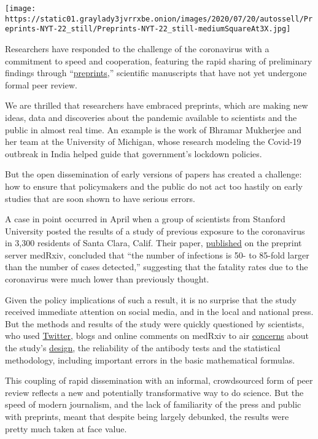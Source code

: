 \texttt{[image: https://static01.graylady3jvrrxbe.onion/images/2020/07/20/autossell/Preprints-NYT-22\_still/Preprints-NYT-22\_still-mediumSquareAt3X.jpg]}

Researchers have responded to the challenge of the coronavirus with a
commitment to speed and cooperation, featuring the rapid sharing of
preliminary findings through
``\href{https://connect.medrxiv.org/relate/content/181}{preprints},''
scientific manuscripts that have not yet undergone formal peer review.

We are thrilled that researchers have embraced preprints, which are
making new ideas, data and discoveries about the pandemic available to
scientists and the public in almost real time. An example is the work of
Bhramar Mukherjee and her team at the University of Michigan, whose
research modeling the Covid-19 outbreak in India helped guide that
government's lockdown policies.

But the open dissemination of early versions of papers has created a
challenge: how to ensure that policymakers and the public do not act too
hastily on early studies that are soon shown to have serious errors.

A case in point occurred in April when a group of scientists from
Stanford University posted the results of a study of previous exposure
to the coronavirus in 3,300 residents of Santa Clara, Calif. Their
paper,
\href{https://www.medrxiv.org/content/10.1101/2020.04.14.20062463v1?versioned=true}{published}
on the preprint server medRxiv, concluded that ``the number of
infections is 50- to 85-fold larger than the number of cases detected,''
suggesting that the fatality rates due to the coronavirus were much
lower than previously thought.

Given the policy implications of such a result, it is no surprise that
the study received immediate attention on social media, and in the local
and national press. But the methods and results of the study were
quickly questioned by scientists, who used
\href{https://twitter.com/wfithian/status/1252692357788479488?s=20}{Twitter},
blogs and online comments on medRxiv to air
\href{https://undark.org/2020/04/24/john-ioannidis-covid-19-death-rate-critics/}{concerns}
about the study's
\href{https://statmodeling.stat.columbia.edu/2020/04/19/fatal-flaws-in-stanford-study-of-coronavirus-prevalence/}{design},
the reliability of the antibody tests and the statistical methodology,
including important errors in the basic mathematical formulas.

This coupling of rapid dissemination with an informal, crowdsourced form
of peer review reflects a new and potentially transformative way to do
science. But the speed of modern journalism, and the lack of familiarity
of the press and public with preprints, meant that despite being largely
debunked, the results were pretty much taken at face value.

